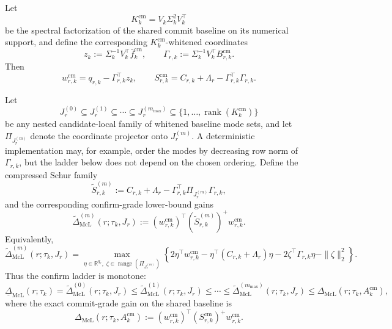 \documentclass[11pt]{article}
\begin{document}
Let
\[
K_k^{\mathrm{cm}}=V_k\Sigma_k^2V_k^\top
\]
be the spectral factorization of the shared commit baseline on its numerical support, and define the corresponding \(K_k^{\mathrm{cm}}\)-whitened coordinates
\[
z_k:=\Sigma_k^{-1}V_k^\top \bar f_k^{\mathrm{cm}},
\qquad
\Gamma_{r,k}:=\Sigma_k^{-1}V_k^\top B_{r,k}^{\mathrm{cm}}.
\]
Then
\[
w_{r,k}^{\mathrm{cm}}
=
q_{r,k}-\Gamma_{r,k}^\top z_k,
\qquad
S_{r,k}^{\mathrm{cm}}
=
C_{r,k}+\Lambda_r-\Gamma_{r,k}^\top \Gamma_{r,k}.
\]

Let
\[
J_r^{(0)}\subseteq J_r^{(1)}\subseteq \cdots \subseteq J_r^{(m_{\max})}
\subseteq
\{1,\dots,\operatorname{rank}(K_k^{\mathrm{cm}})\}
\]
be any nested candidate-local family of whitened baseline mode sets, and let \(\Pi_{J_r^{(m)}}\) denote the coordinate projector onto \(J_r^{(m)}\). A deterministic implementation may, for example, order the modes by decreasing row norm of \(\Gamma_{r,k}\), but the ladder below does not depend on the chosen ordering. Define the compressed Schur family
\[
\widetilde S_{r,k}^{(m)}
:=
C_{r,k}+\Lambda_r-\Gamma_{r,k}^\top \Pi_{J_r^{(m)}}\Gamma_{r,k},
\]
and the corresponding confirm-grade lower-bound gains
\[
\widetilde\Delta_{\mathrm{McL}}^{(m)}(r;\tau_k,J_r)
:=
(w_{r,k}^{\mathrm{cm}})^\top
(\widetilde S_{r,k}^{(m)})^+
w_{r,k}^{\mathrm{cm}}.
\]
Equivalently,
\[
\widetilde\Delta_{\mathrm{McL}}^{(m)}(r;\tau_k,J_r)
=
\max_{\eta\in\mathbb R^{q_r},\;\zeta\in\operatorname{range}(\Pi_{J_r^{(m)}})}
\left\{
2\eta^\top w_{r,k}^{\mathrm{cm}}
-\eta^\top(C_{r,k}+\Lambda_r)\eta
-2\zeta^\top\Gamma_{r,k}\eta
-\|\zeta\|_2^2
\right\}.
\]
Thus the confirm ladder is monotone:
\[
\underline\Delta_{\mathrm{McL}}(r;\tau_k)
=
\widetilde\Delta_{\mathrm{McL}}^{(0)}(r;\tau_k,J_r)
\le
\widetilde\Delta_{\mathrm{McL}}^{(1)}(r;\tau_k,J_r)
\le
\cdots
\le
\widetilde\Delta_{\mathrm{McL}}^{(m_{\max})}(r;\tau_k,J_r)
\le
\Delta_{\mathrm{McL}}(r;\tau_k,A_k^{\mathrm{cm}}),
\]
where the exact commit-grade gain on the shared baseline is
\[
\Delta_{\mathrm{McL}}(r;\tau_k,A_k^{\mathrm{cm}})
:=
(w_{r,k}^{\mathrm{cm}})^\top (S_{r,k}^{\mathrm{cm}})^+ w_{r,k}^{\mathrm{cm}}.
\]
\end{document}
